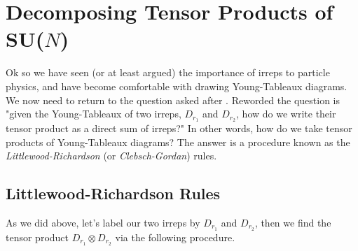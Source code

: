 \chapter{Decomposing Tensor Products of SU($N$)}

Ok so we have seen (or at least argued) the importance of irreps to particle physics, and have become comfortable with drawing Young-Tableaux diagrams. We now need to return to the question asked after . Reworded the question is "given the Young-Tableaux of two irreps, $D_{r_1}$ and $D_{r_2}$, how do we write their tensor product as a direct sum of irreps?" In other words, how do we take tensor products of Young-Tableaux diagrams? The answer is a procedure known as the \textit{Littlewood-Richardson} (or \textit{Clebsch-Gordan}) rules. 

\section{Littlewood-Richardson Rules}

As we did above, let's label our two irreps by $D_{r_1}$ and $D_{r_2}$, then we find the tensor product $D_{r_1}\otimes D_{r_2}$ via the following procedure. 

